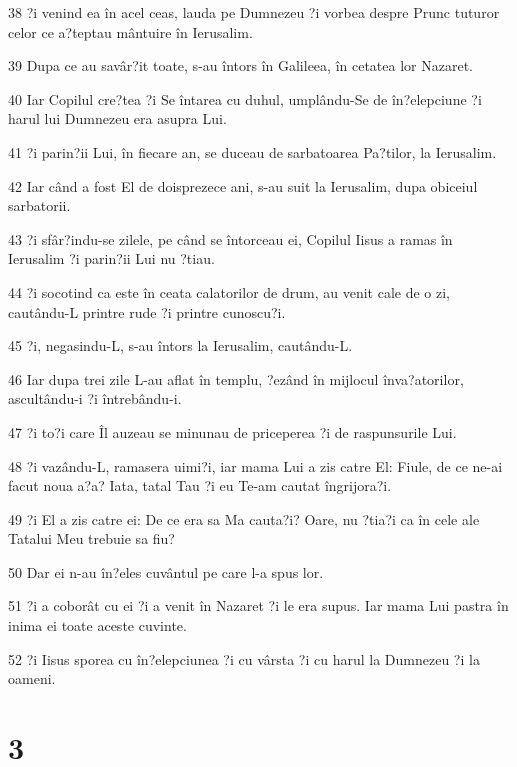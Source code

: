 \par 38 ?i venind ea în acel ceas, lauda pe Dumnezeu ?i vorbea despre Prunc tuturor celor ce a?teptau mântuire în Ierusalim.
\par 39 Dupa ce au savâr?it toate, s-au întors în Galileea, în cetatea lor Nazaret.
\par 40 Iar Copilul cre?tea ?i Se întarea cu duhul, umplându-Se de în?elepciune ?i harul lui Dumnezeu era asupra Lui.
\par 41 ?i parin?ii Lui, în fiecare an, se duceau de sarbatoarea Pa?tilor, la Ierusalim.
\par 42 Iar când a fost El de doisprezece ani, s-au suit la Ierusalim, dupa obiceiul sarbatorii.
\par 43 ?i sfâr?indu-se zilele, pe când se întorceau ei, Copilul Iisus a ramas în Ierusalim ?i parin?ii Lui nu ?tiau.
\par 44 ?i socotind ca este în ceata calatorilor de drum, au venit cale de o zi, cautându-L printre rude ?i printre cunoscu?i.
\par 45 ?i, negasindu-L, s-au întors la Ierusalim, cautându-L.
\par 46 Iar dupa trei zile L-au aflat în templu, ?ezând în mijlocul înva?atorilor, ascultându-i ?i întrebându-i.
\par 47 ?i to?i care Îl auzeau se minunau de priceperea ?i de raspunsurile Lui.
\par 48 ?i vazându-L, ramasera uimi?i, iar mama Lui a zis catre El: Fiule, de ce ne-ai facut noua a?a? Iata, tatal Tau ?i eu Te-am cautat îngrijora?i.
\par 49 ?i El a zis catre ei: De ce era sa Ma cauta?i? Oare, nu ?tia?i ca în cele ale Tatalui Meu trebuie sa fiu?
\par 50 Dar ei n-au în?eles cuvântul pe care l-a spus lor.
\par 51 ?i a coborât cu ei ?i a venit în Nazaret ?i le era supus. Iar mama Lui pastra în inima ei toate aceste cuvinte.
\par 52 ?i Iisus sporea cu în?elepciunea ?i cu vârsta ?i cu harul la Dumnezeu ?i la oameni.

\chapter{3}

